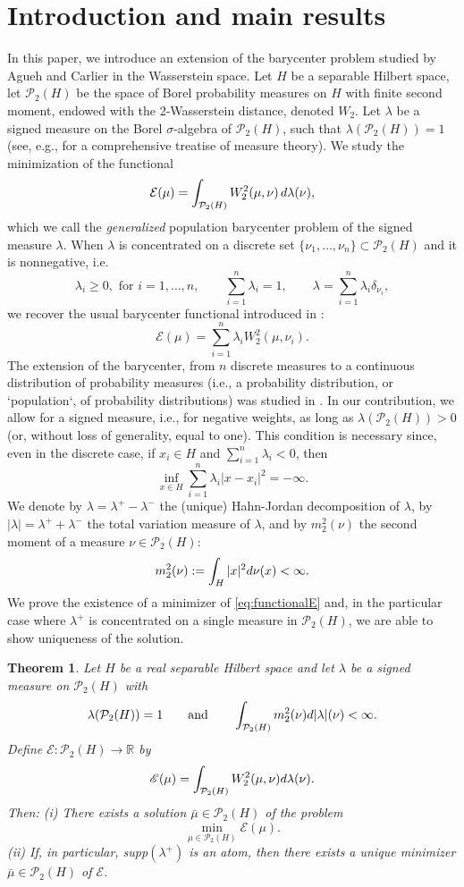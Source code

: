 \documentclass[12pt,a4paper]{article}
\newcommand{\R}{\mathbb{R}}
\renewcommand{\d}{{\rm d}}
\newcommand{\X}{\mathcal{P}_2(H)}
\theoremstyle{plain}
\newtheorem{theorem}{Theorem}[section]
\theoremstyle{definition}
\begin{document}
\section{Introduction and main results}
In this paper, we introduce an extension of the barycenter problem studied by Agueh and Carlier \cite{agueh-carlier} 
in the Wasserstein space. Let $H$ be a separable Hilbert space, let $\X$ be the space of Borel probability measures on $H$ with finite second moment, endowed with the 2-Wasserstein distance, denoted $W_2$. Let  $\lambda$ be a signed measure on the Borel $\sigma$-algebra of $\X$, such that $\lambda(\X)=1$ (see, e.g., \cite{bogachev} for a comprehensive treatise of measure theory).  We study the minimization of the functional %
\begin{equation}
\label{eq:functionalE}
	\mathcal E(\mu) = \int_{\X} W_2^2(\mu,\nu)\,\d\lambda(\nu),
\end{equation}
which we call the \emph{generalized} population barycenter problem of the signed measure $\lambda$. When $\lambda$ is concentrated on a discrete set $\{\nu_1,\ldots,\nu_n\}\subset \X$ and it is nonnegative, i.e.
\[
	\lambda_i \geq 0,\text{ for } i=1,\ldots,n,\qquad \sum_{i=1}^n \lambda_i=1,\qquad \lambda= \sum_{i=1}^n \lambda_i \delta_{\nu_i},
\] 
we recover the usual barycenter functional introduced in \cite{agueh-carlier}:
\[
	\mathcal E(\mu) = \sum_{i=1}^n \lambda_i W_2^2(\mu,\nu_i).
\]
The extension of the barycenter, from $n$ discrete measures to a continuous distribution of probability measures (i.e., a probability distribution, or `population`, of probability distributions) was studied in \cite{bigot2012, bigot2018, legouic}. In our contribution, we allow for a signed measure, i.e., for negative weights, as long as $\lambda(\X)>0$ (or, without loss of generality, equal to one). This condition is necessary since, even in the discrete case, if $x_i\in H$ and $\sum_{i=1}^n\lambda_i <0$, then
\[
		\inf_{x \in H} \sum_{i=1}^n \lambda_i |x-x_i|^2=-\infty.
\]
We denote by $\lambda = \lambda^+ - \lambda^-$ the (unique) Hahn-Jordan decomposition of $\lambda$,  by $|\lambda|=\lambda^+ +\lambda^-$ the total variation measure of $\lambda$, and  by $m_2^2(\nu)$ the second moment of a measure $\nu\in \X$:
\[
	m_2^2(\nu):=\int_H |x|^2\d\nu(x) <\infty.
\]
We prove the existence of a minimizer of \eqref{eq:functionalE} and, in the particular case where $\lambda^+$ is concentrated on a single measure in $\X$, we are able to show uniqueness of the solution. 
\begin{theorem}
\label{th:newmain}
Let $H$ be a real separable Hilbert space and let $\lambda$ be a signed measure on $\X$ with 
\begin{equation}
\label{eq:main_hyp}
	\lambda(\X)=1\qquad \text{and}\qquad  \int_{\X}  m_2^2(\nu)\d|\lambda|(\nu)<\infty.
\end{equation}
Define $\mathscr{E}:\X\to \R$ by
\[
	\mathscr{E}(\mu)=\int_{\X}  W^2_2(\mu,\nu)\d\lambda(\nu).
\]
Then:
(i) There exists a solution $\bar \mu \in \X$ of the problem
\[	
	\min_{\mu \in \X} \mathscr{E}(\mu).
\]
(ii) If, in particular, supp$(\lambda^+)$ is an atom, then there exists a unique minimizer $\bar \mu\in \X$ of $\mathscr{E}$.
\end{theorem}
\end{document}
